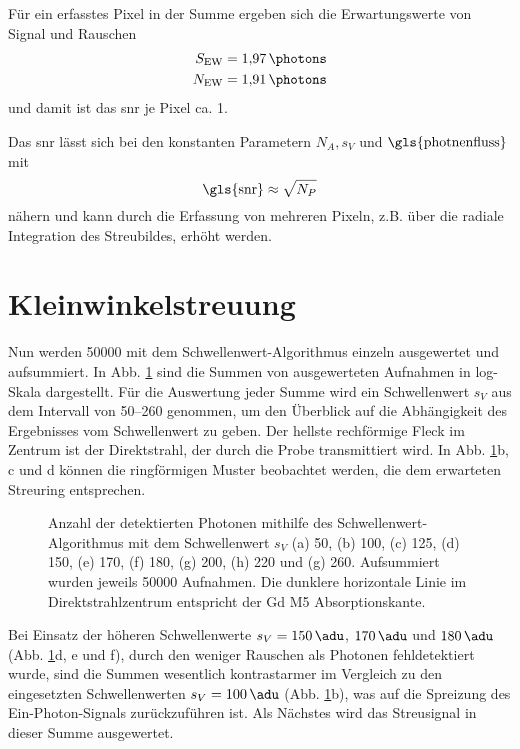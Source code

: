 \noindent
Für ein erfasstes Pixel in der Summe ergeben sich die Erwartungswerte von Signal und Rauschen \begin{equation}
    \begin{split}
        S_\text{EW} &= \SI{1.97}{\photons}\\
        N_\text{EW} &= \SI{1.91}{\photons}\\
    \end{split}
\end{equation}
und damit ist das \gls{snr} je Pixel ca. 1.

\noindent
Das \gls{snr} lässt sich bei den konstanten Parametern $N_A, s_V$ und $\text{\gls{photnenfluss}}$ mit
\begin{equation}
    \text{\gls{snr}} \approx \sqrt{N_P}
    \label{eq:snr_pixel}
\end{equation}
nähern und kann durch die Erfassung von mehreren Pixeln, z.B. über die radiale Integration des Streubildes, erhöht werden.

\section{Kleinwinkelstreuung}
Nun werden \SI{50000}{\captures} mit dem Schwellenwert-Algorithmus einzeln ausgewertet und aufsummiert. In Abb. \ref{fig:th_50_100_125_150_170_180_200_220_260} sind die Summen von ausgewerteten Aufnahmen in log-Skala dargestellt. Für die Auswertung jeder Summe wird ein Schwellenwert $s_V$ aus dem Intervall von \SIrange{50}{260}{\adu} genommen, um den Überblick auf die Abhängigkeit des Ergebnisses vom Schwellenwert zu geben. Der hellste rechförmige Fleck im Zentrum ist der Direktstrahl, der durch die Probe transmittiert wird. In Abb. \ref{fig:th_50_100_125_150_170_180_200_220_260}b, c und d können die ringförmigen Muster beobachtet werden, die dem erwarteten Streuring entsprechen.
\begin{figure}[H]
    \centering
    
    \caption{Anzahl der detektierten Photonen mithilfe des Schwellenwert-Algorithmus mit dem Schwellenwert $s_V$ (a) \SI{50}{\adu}, (b) \SI{100}{\adu}, (c) \SI{125}{\adu}, (d) \SI{150}{\adu}, (e) \SI{170}{\adu}, (f) \SI{180}{\adu}, (g) \SI{200}{\adu}, (h) \SI{220}{\adu} und (g) \SI{260}{\adu}. Aufsummiert wurden jeweils \num{50000} Aufnahmen. Die dunklere horizontale Linie im Direktstrahlzentrum entspricht der Gd M5 Absorptionskante.}
    \label{fig:th_50_100_125_150_170_180_200_220_260}
\end{figure}
\noindent
Bei Einsatz der höheren Schwellenwerte $s_V = \SI{150}{\adu}$, $\SI{170}{\adu}$ und $\SI{180}{\adu}$ (Abb. \ref{fig:th_50_100_125_150_170_180_200_220_260}d, e und f), durch den weniger Rauschen als Photonen fehldetektiert wurde, sind die Summen wesentlich kontrastarmer im Vergleich zu den eingesetzten Schwellenwerten $s_V = \SI{100}{\adu}$ (Abb. \ref{fig:th_50_100_125_150_170_180_200_220_260}b), was auf die Spreizung des Ein-Photon-Signals zurückzuführen ist. Als Nächstes wird das Streusignal in dieser Summe ausgewertet. 

